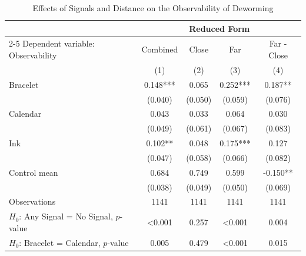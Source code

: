 \documentclass[12pt,a4paper]{article}
\begin{document}
\begin{table}[!htbp]\centering
\caption{Effects of Signals and Distance on the Observability of Deworming}
\label{tab:obs_table1_smscontrol_all}
\begin{tabular}{lcccc}
\hline\hline
 & \multicolumn{4}{c}{Reduced Form} \\
\cline{2-5}
Dependent variable: Observability & Combined & Close & Far & Far - Close \\
 & (1) & (2) & (3) & (4) \\
\hline
Bracelet & 0.148*** & 0.065 & 0.252*** & 0.187** \\
 & (0.040) & (0.050) & (0.059) & (0.076) \\
Calendar & 0.043 & 0.033 & 0.064 & 0.030 \\
 & (0.049) & (0.061) & (0.067) & (0.083) \\
Ink & 0.102** & 0.048 & 0.175*** & 0.127 \\
 & (0.047) & (0.058) & (0.066) & (0.082) \\
\hline
Control mean & 0.684 & 0.749 & 0.599 & -0.150** \\
 & (0.038) & (0.049) & (0.050) & (0.069) \\
Observations & 1141 & 1141 & 1141 & 1141 \\
$H_0$: Any Signal = No Signal, $p$-value & <0.001 & 0.257 & <0.001 & 0.004 \\
$H_0$: Bracelet = Calendar, $p$-value & 0.005 & 0.479 & <0.001 & 0.015 \\
\hline\hline
\end{tabular}
\end{table}
\end{document}
